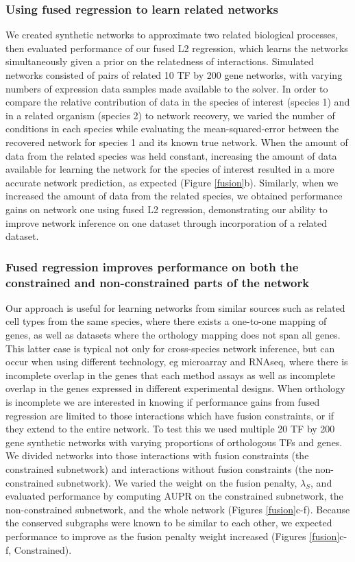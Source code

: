 \documentclass[11pt]{article}
\begin{document}
\subsubsection{Using fused regression to learn related networks}
We created synthetic networks to approximate two related biological processes, then evaluated performance of our fused L2 regression, which learns the networks simultaneously given a prior on the relatedness of interactions. Simulated networks consisted of pairs of related 10 TF by 200 gene networks, with varying numbers of expression data samples made available to the solver. In order to compare the relative contribution of data in the species of interest (species 1) and in a related organism (species 2) to network recovery, we varied the number of conditions in each species while evaluating the mean-squared-error between the recovered network for species 1 and its known true network. When the amount of data from the related species was held constant, increasing the amount of data available for learning the network for the species of interest resulted in a more accurate network prediction, as expected  (Figure \ref{fusion}b). Similarly, when we increased the amount of data from the related species, we obtained performance gains on network one using fused L2 regression, demonstrating our ability to improve network inference on one dataset through incorporation of a related dataset.


\subsubsection{Fused regression improves performance on both the constrained and non-constrained parts of the network}
Our approach is useful for learning networks from similar sources such as related cell types from the same species, where there exists a one-to-one mapping of genes, as well as datasets where the orthology mapping does not span all genes. This latter case is typical not only for cross-species network inference, but can occur when using different technology, eg microarray and RNAseq, where there is incomplete overlap in the genes that each method assays as well as incomplete overlap in the genes expressed in different experimental designs. When orthology is incomplete we are interested in knowing if performance gains from fused regression are limited to those interactions which have fusion constraints, or if they extend to the entire network. To test this we used multiple 20 TF by 200 gene synthetic networks with varying proportions of orthologous TFs and genes. We divided networks into those interactions with fusion constraints (the constrained subnetwork) and interactions without fusion constraints (the non-constrained subnetwork). 
We varied the weight on the fusion penalty, $\lambda_S$, and evaluated performance by computing AUPR on the constrained subnetwork, the non-constrained subnetwork, and the whole network (Figures \ref{fusion}c-f). Because the conserved subgraphs were known to be similar to each other, we expected performance to improve as the fusion penalty weight increased (Figures \ref{fusion}c-f, Constrained).
\end{document}
